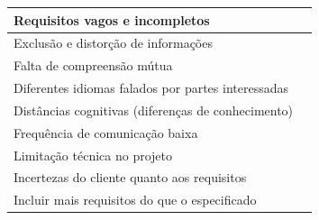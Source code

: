 \begin{longtable}{|p{5cm}|p{10cm}|}
\\ \hline
Requisitos vagos e incompletos                               & 
\cite{soltani2015cross} \cite{karlsson2007requirements}\cite{kiritani2015success}\cite{ali2016method}\cite{Jarke2011992} \cite{Ghanbari201532}                                       \\ \hline
Exclusão e distorção de informações                          &  \cite{echeverria2017influence}\cite{soltani2015cross}\cite{cois2014modern}\cite{sinha2006enabling}\cite{aceituna2014model}\cite{Tu2016}                                                                                       \\ \hline
Falta de compreensão mútua                                   &  \cite{wu2015analysis}\cite{karlsson2007requirements}\cite{khan2014proposed}\cite{unknown}\cite{Amrit:2017:EME:3084381.3084413}                                                                                                                                             \\ \hline
Diferentes idiomas falados por partes interessadas      &      \cite{pilat2011knowledge} \cite{mahmood2013software} \cite{khan2014proposed}                                                                                                                                                                                                         \\ \hline
Distâncias cognitivas (diferenças de conhecimento)           &                      \cite{mellhorn2017improving}  \cite{pilat2011knowledge}  \cite{maier2006identifying}                                                                                                                                                                                                                 \\ \hline
Frequência de comunicação baixa                              &                          \cite{diel2016communication}           \cite{marnewick2011perspective}                                                             \\ \hline
Limitação técnica no projeto                                 &       \cite{bjarnason2017role} \cite{sedelmaier2017can}                            \\ \hline
Incertezas do cliente quanto aos requisitos                  &  \cite{soltani2015cross}
\\ \hline

Incluir mais requisitos do que o especificado                &            \cite{bjarnason2011requirements}
\\ \hline



\end{longtable}
